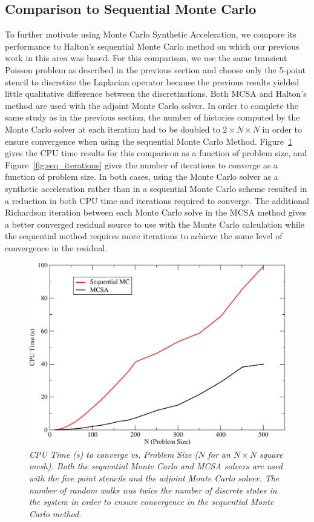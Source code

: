 \documentclass[preprint,12pt]{elsarticle}
\begin{document}
\subsection{Comparison to Sequential Monte Carlo}
\label{subsec:sequential_comparison}
To further motivate using Monte Carlo Synthetic Acceleration, we compare its
performance to Halton's sequential Monte Carlo method on which our previous
work in this area was based. For this comparison, we use the same transient
Poisson problem as described in the previous section and choose only the
5-point stencil to discretize the Laplacian operator because the previous
results yielded little qualitative difference between the
discretizations. Both MCSA and Halton's method are used with the adjoint Monte
Carlo solver. In order to complete the same study as in the previous section,
the number of histories computed by the Monte Carlo solver at each iteration
had to be doubled to $2 \times N \times N$ in order to ensure convergence when
using the sequential Monte Carlo Method. Figure~\ref{fig:seq_cpu_time} gives
the CPU time results for this comparison as a function of problem size, and
Figure~\ref{fig:seq_iterations} gives the number of iterations to converge as
a function of problem size. In both cases, using the Monte Carlo solver as a
synthetic acceleration rather than in a sequential Monte Carlo scheme resulted
in a reduction in both CPU time and iterations required to converge. The
additional Richardson iteration between each Monte Carlo solve in the MCSA
method gives a better converged residual source to use with the Monte Carlo
calculation while the sequential method requires more iterations to achieve
the same level of convergence in the residual.

\begin{figure}[ht!]
  \centering
  \includegraphics[width=5in,clip]{seq_cpu.pdf}
  \caption{\sl CPU Time (s) to converge vs. Problem Size ($N$ for an
    $N \times N$ square mesh). Both the sequential Monte Carlo and
    MCSA solvers are used with the five point stencils and the adjoint
    Monte Carlo solver. The number of random walks was twice the
    number of discrete states in the system in order to ensure
    convergence in the sequential Monte Carlo method.}
  \label{fig:seq_cpu_time}
\end{figure}
\end{document}
